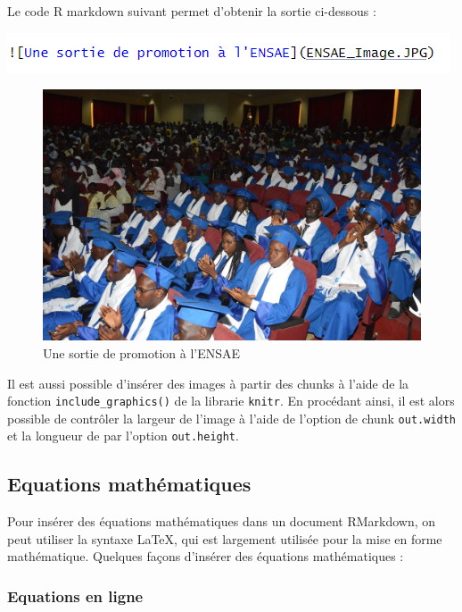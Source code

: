 \documentclass[
  12pt,
]{article}
\begin{document}
Le code R markdown suivant permet d'obtenir la sortie ci-dessous :

\begin{center}\includegraphics[width=0.8\linewidth,height=0.8\textheight]{../Document_Rmarkdown/Images/code_image} \end{center}

\begin{figure}
\centering
\includegraphics{ENSAE_Image.JPG}
\caption{Une sortie de promotion à l'ENSAE}
\end{figure}

Il est aussi possible d'insérer des images à partir des chunks à l'aide
de la fonction \texttt{include\_graphics()} de la librarie
\texttt{knitr}. En procédant ainsi, il est alors possible de contrôler
la largeur de l'image à l'aide de l'option de chunk \texttt{out.width}
et la longueur de par l'option \texttt{out.height}.

\newpage

\subsection{Equations mathématiques}\label{equations-mathuxe9matiques}

Pour insérer des équations mathématiques dans un document RMarkdown, on
peut utiliser la syntaxe LaTeX, qui est largement utilisée pour la mise
en forme mathématique. Quelques façons d'insérer des équations
mathématiques :

\subsubsection{Equations en ligne}\label{equations-en-ligne}
\end{document}
